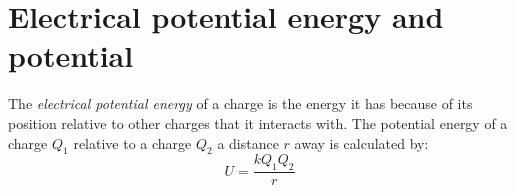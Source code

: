 \section{Electrical potential energy and potential}

The \textit{electrical potential energy} of a charge is the energy
it has because of its position relative to other charges that it
interacts with. The potential energy of a charge $Q_1$ relative to
a charge $Q_2$ a distance $r$ away is calculated by:\\
\begin{equation*}
U=\frac{kQ_1Q_2}{r}
\end{equation*}

